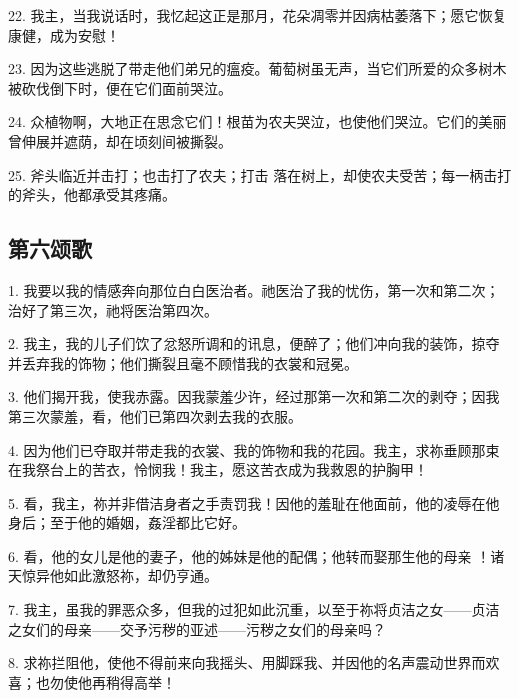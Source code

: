 22. 我主，当我说话时，我忆起这正是那月，花朵凋零并因病枯萎落下；愿它恢复康健，成为安慰！\par

23. 因为这些逃脱了带走他们弟兄的瘟疫。葡萄树虽无声，当它们所爱的众多树木被砍伐倒下时，便在它们面前哭泣。\par

24. 众植物啊，大地正在思念它们！根苗为农夫哭泣，也使他们哭泣。它们的美丽曾伸展并遮荫，却在顷刻间被撕裂。\par

25. 斧头临近并击打；也击打了农夫；打击 落在树上，却使农夫受苦；每一柄击打的斧头，他都承受其疼痛。\par


\subsection{第六颂歌}

1. 我要以我的情感奔向那位白白医治者。祂医治了我的忧伤，第一次和第二次；治好了第三次，祂将医治第四次。\par

2. 我主，我的儿子们饮了忿怒所调和的讯息，便醉了；他们冲向我的装饰，掠夺并丢弃我的饰物；他们撕裂且毫不顾惜我的衣裳和冠冕。\par

3. 他们揭开我，使我赤露。因我蒙羞少许，经过那第一次和第二次的剥夺；因我第三次蒙羞，看，他们已第四次剥去我的衣服。\par

4. 因为他们已夺取并带走我的衣裳、我的饰物和我的花园。我主，求祢垂顾那束在我祭台上的苦衣，怜悯我！我主，愿这苦衣成为我救恩的护胸甲！\par

5. 看，我主，祢并非借洁身者之手责罚我！因他的羞耻在他面前，他的凌辱在他身后；至于他的婚姻，姦淫都比它好。\par

6. 看，他的女儿是他的妻子，他的姊妹是他的配偶；他转而娶那生他的母亲 ！诸天惊异他如此激怒祢，却仍亨通。\par

7. 我主，虽我的罪恶众多，但我的过犯如此沉重，以至于祢将贞洁之女——贞洁之女们的母亲——交予污秽的亚述——污秽之女们的母亲吗？\par

8. 求祢拦阻他，使他不得前来向我摇头、用脚踩我、并因他的名声震动世界而欢喜；也勿使他再稍得高举！\par

